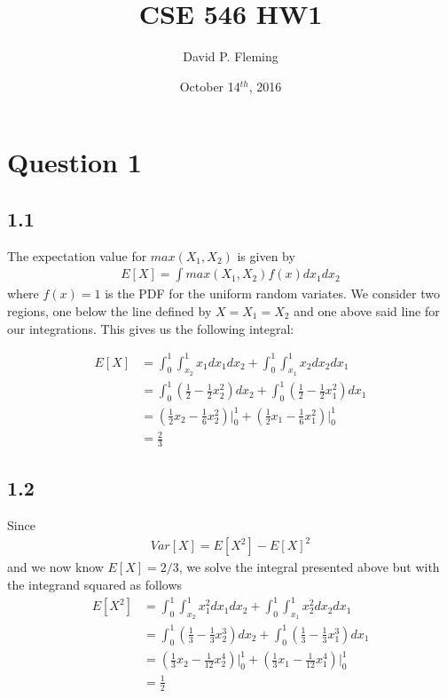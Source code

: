 \documentclass[12pt]{amsart}
\title{CSE 546 HW1}
\author{David P. Fleming}
\date{October 14$^{th}$, 2016}
\begin{document}
\maketitle
\tableofcontents


\section*{Question 1}

\subsection*{1.1}
The expectation value for $max(X_1, X_2)$ is given by
\begin{align}
E[X] = \int max(X_1,X_2) f(x) dx_1 dx_2
\end{align}
where $f(x) = 1$ is the PDF for the uniform random variates.  We consider two regions, one below the line defined by $X = X_1 = X_2$ and one above said line for our integrations.  This gives us the following integral:

\begin{equation} \label{eqn:1.1}
\begin{split}
E[X] & = \int_0^1 \int_{x_2}^1 x_1 dx_1 dx_2 + \int_0^1 \int_{x_1}^1 x_2 dx_2 dx_1 \\
& = \int_0^1 (\frac{1}{2} - \frac{1}{2}x_2^2) dx_2 + \int_0^1 (\frac{1}{2} - \frac{1}{2}x_1^2) dx_1 \\
& = (\frac{1}{2}x_2 - \frac{1}{6}x_2^2) \vert_0^1 + (\frac{1}{2}x_1 - \frac{1}{6}x_1^2) \vert_0^1 \\
& = \frac{2}{3}
\end{split}
\end{equation}

\subsection*{1.2}
Since
\begin{align}
Var[X] = E[X^2] - E[X]^2
\end{align}
and we now know $E[X] = 2/3$, we solve the integral presented above but with the integrand squared as follows
\begin{equation} \label{eqn:1.2}
\begin{split}
E[X^2] & = \int_0^1 \int_{x_2}^1 x_1^2 dx_1 dx_2 + \int_0^1 \int_{x_1}^1 x_2^2 dx_2 dx_1 \\
& = \int_0^1 (\frac{1}{3} - \frac{1}{3}x_2^3) dx_2 + \int_0^1 (\frac{1}{3} - \frac{1}{3}x_1^3) dx_1 \\
& = (\frac{1}{3}x_2 - \frac{1}{12}x_2^4)\vert_0^1 + (\frac{1}{3}x_1 - \frac{1}{12}x_1^4)\vert_0^1 \\
& = \frac{1}{2}
\end{split}
\end{equation}
\end{document}
